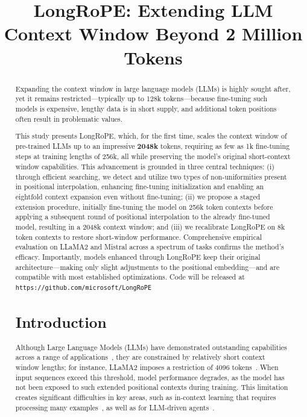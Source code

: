 \title{LongRoPE: Extending LLM Context Window Beyond 2 Million Tokens}

\begin{abstract}
Expanding the context window in large language models (LLMs) is highly sought after, yet it remains restricted—typically up to 128k tokens—because fine-tuning such models is expensive, lengthy data is in short supply, and additional token positions often result in problematic values.

This study presents LongRoPE, which, for the first time, scales the context window of pre-trained LLMs up to an impressive \textbf{2048k} tokens, requiring as few as 1k fine-tuning steps at training lengths of 256k, all while preserving the model’s original short-context window capabilities. This advancement is grounded in three central techniques: (i) through efficient searching, we detect and utilize two types of non-uniformities present in positional interpolation, enhancing fine-tuning initialization and enabling an eightfold context expansion even without fine-tuning; (ii) we propose a staged extension procedure, initially fine-tuning the model on 256k token contexts before applying a subsequent round of positional interpolation to the already fine-tuned model, resulting in a 2048k context window; and (iii) we recalibrate LongRoPE on 8k token contexts to restore short-window performance. Comprehensive empirical evaluation on LLaMA2 and Mistral across a spectrum of tasks confirms the method's efficacy. Importantly, models enhanced through LongRoPE keep their original architecture—making only slight adjustments to the positional embedding—and are compatible with most established optimizations. Code will be released at \texttt{https://github.com/microsoft/LongRoPE}

\section{Introduction}

Although Large Language Models (LLMs) have demonstrated outstanding capabilities across a range of applications~\cite{gpt4,llama2}, they are constrained by relatively short context window lengths; for instance, LLaMA2 imposes a restriction of 4096 tokens~\cite{llama2}. When input sequences exceed this threshold, model performance degrades, as the model has not been exposed to such extended positional contexts during training. This limitation creates significant difficulties in key areas, such as in-context learning that requires processing many examples~\cite{Huang2023FewerIM}, as well as for LLM-driven agents~\cite{park2023generative,madaan2023selfrefine}.


\end{abstract}

